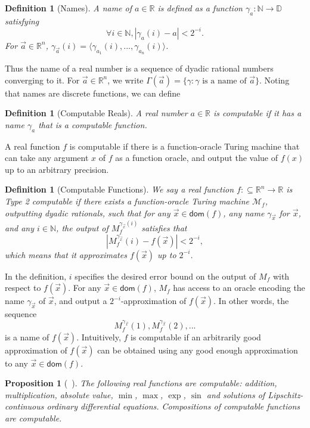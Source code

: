 \documentclass[12pt]{article}
\theoremstyle{plain}
\newtheorem{proposition}[theorem]{Proposition}
\newtheorem{definition}[theorem]{Definition}
\theoremstyle{definition}
\newcommand{\dom}{\mathsf{dom}}
\begin{document}
\begin{definition}[Names]
A name of $a\in \mathbb{R}$ is defined as a function $\mathcal{\gamma}_a: \mathbb{N}\rightarrow \mathbb{D}$ satisfying
$$\forall i\in \mathbb{N}, |\gamma_a(i) - a|<2^{-i}.$$
For $\vec a\in \mathbb{R}^n$, $\gamma_{\vec a}(i) = \langle \gamma_{a_1}(i), ..., \gamma_{a_n}(i)\rangle$.
\end{definition}
Thus the name of a real number is a sequence of dyadic rational numbers converging to it. For $\vec a\in \mathbb{R}^n$, we write $\Gamma(\vec a) = \{\gamma: \gamma\mbox{ is a name of }\vec a\}$. Noting that names are discrete functions, we can define
\begin{definition}[Computable Reals]
A real number $a\in \mathbb{R}$ is computable if it has a name $\gamma_{a}$ that is a computable function.
\end{definition}

A real function $f$ is computable if there is a function-oracle Turing machine that can take any argument $x$ of $f$ as a function oracle, and output the value of $f(x)$ up to an arbitrary precision.

\begin{definition}[Computable Functions]
We say a real function $f:\subseteq\mathbb{R}^n\rightarrow \mathbb{R}$ is Type 2 computable if there exists a function-oracle Turing machine $\mathcal{M}_f$, outputting dyadic rationals, such that for any $\vec x \in \dom(f)$, any name $\gamma_{\vec x}$ for $\vec x$, and any $i \in \mathbb{N}$, the output of $M_f^{\gamma_{\vec x}(i)}$ satisfies that
$$|M_f^{\gamma_{\vec x}}(i) - f(\vec x)|<2^{-i},$$
which means that it approximates $f(\vec x)$ up to $2^{-i}$.
\end{definition}

In the definition, $i$ specifies the desired error bound on the output of $M_f$ with respect to $f(\vec x)$. For any $\vec x\in \dom(f)$, $M_f$ has access to an oracle encoding the name $\gamma_{\vec x}$ of $\vec x$, and output a $2^{-i}$-approximation of $f(\vec x)$. In other words, the sequence
$$M_f^{\gamma_{\vec x}}(1), M_f^{\gamma_{\vec x}}(2), ... $$
is a name of $f(\vec x)$. Intuitively, $f$ is computable if an arbitrarily good approximation of $f(\vec x)$ can be obtained using any good enough approximation to any $\vec x\in\dom(f)$.
\begin{proposition}[~\cite{CAbook}]
The following real functions are computable: addition, multiplication, absolute value, $\min$, $\max$, $\exp$, $\sin$ and solutions of Lipschitz-continuous ordinary differential equations. Compositions of computable functions are computable.
\end{proposition}
\end{document}
